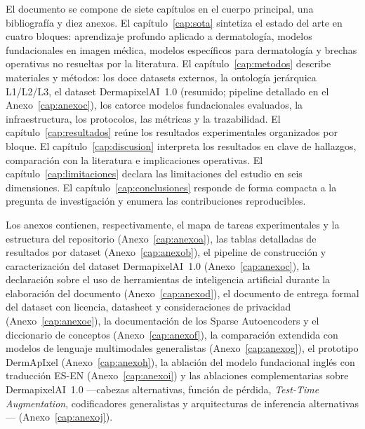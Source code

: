El documento se compone de siete capítulos en el cuerpo principal,
una bibliografía y diez anexos. El capítulo~\ref{cap:sota} sintetiza
el estado del arte en cuatro bloques: aprendizaje profundo aplicado
a dermatología, modelos fundacionales en imagen médica, modelos
específicos para dermatología y brechas operativas no resueltas por
la literatura. El capítulo~\ref{cap:metodos} describe materiales y
métodos: los doce datasets externos, la ontología jerárquica
L1/L2/L3, el dataset DermapixelAI~1.0 (resumido; pipeline detallado
en el Anexo~\ref{cap:anexoc}), los catorce modelos fundacionales
evaluados, la infraestructura, los protocolos, las métricas y la
trazabilidad. El
capítulo~\ref{cap:resultados} reúne los resultados experimentales
organizados por bloque. El capítulo~\ref{cap:discusion} interpreta
los resultados en clave de hallazgos, comparación con la literatura
e implicaciones operativas. El capítulo~\ref{cap:limitaciones}
declara las limitaciones del estudio en seis dimensiones. El
capítulo~\ref{cap:conclusiones} responde de forma compacta a la
pregunta de investigación y enumera las contribuciones
reproducibles.

Los anexos contienen, respectivamente, el mapa de tareas
experimentales y la estructura del repositorio
(Anexo~\ref{cap:anexoa}), las tablas detalladas de resultados por
dataset (Anexo~\ref{cap:anexob}), el pipeline de construcción y
caracterización del dataset DermapixelAI~1.0
(Anexo~\ref{cap:anexoc}), la declaración sobre el uso de
herramientas de inteligencia artificial durante la elaboración del
documento (Anexo~\ref{cap:anexod}), el documento de entrega formal
del dataset con licencia, datasheet y consideraciones de privacidad
(Anexo~\ref{cap:anexoe}), la documentación de los Sparse
Autoencoders y el diccionario de conceptos
(Anexo~\ref{cap:anexof}), la comparación extendida con modelos
de lenguaje multimodales generalistas (Anexo~\ref{cap:anexog}),
el prototipo DermApIxel (Anexo~\ref{cap:anexoh}), la ablación del
modelo fundacional inglés con traducción ES-EN
(Anexo~\ref{cap:anexoi}) y las ablaciones complementarias sobre
DermapixelAI~1.0 ---cabezas alternativas, función de pérdida,
\emph{Test-Time Augmentation}, codificadores generalistas y
arquitecturas de inferencia alternativas--- (Anexo~\ref{cap:anexoj}).
